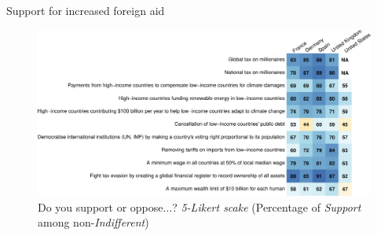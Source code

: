 \begin{frame}{Support for increased foreign aid\label{}}
    \begin{figure} %
        \centering 
        \caption{Do you support or oppose...? \textit{5-Likert scake} (Percentage of \textit{Support} among non-\textit{Indifferent})}
        \includegraphics[height=.9\textheight]{../figures/country_comparison/support_likert_share.pdf} 
    \end{figure}
\end{frame}